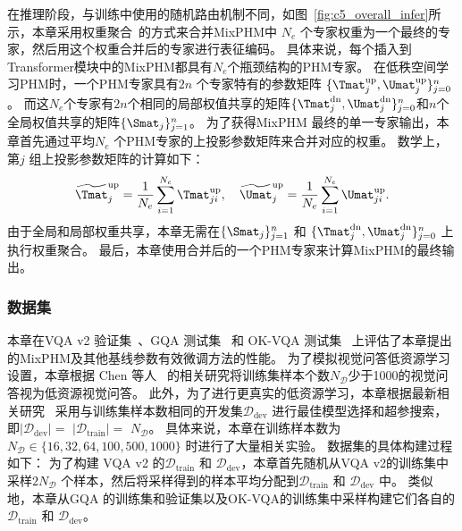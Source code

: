 在推理阶段，与训练中使用的随机路由机制不同，如图~\ref{fig:c5_overall_infer}所示，本章采用权重聚合~\cite{wortsman2022model}的方式来合并MixPHM中 $N_e$ 个专家权重为一个最终的专家，然后用这个权重合并后的专家进行表征编码。
具体来说，每个插入到Transformer模块中的MixPHM都具有$N_e$个瓶颈结构的PHM专家。
在低秩空间学习PHM时，一个PHM专家具有$2n$ 个专家特有的参数矩阵 $\{\Tmat_j^{\text{up}}, \Umat_j^{\text{up}}\}_{j=0}^n$。
而这$N_e$个专家有$2n$个相同的局部权值共享的矩阵$\{\Tmat_j^{\text{dn}}, \Umat_j^{\text{dn}}\}_{j=0}^n$和$n$个全局权值共享的矩阵$\{\Smat_j \}_{j=1}^n$。
为了获得MixPHM 最终的单一专家输出，本章首先通过平均$N_e$ 个PHM专家的上投影参数矩阵来合并对应的权重。
数学上，第$j$ 组上投影参数矩阵的计算如下：
\begin{equation}
\begin{aligned}
\widetilde{\Tmat}_j^{\text{up}} = \frac{1}{N_e} \sum_{i=1}^{N_e} \Tmat_{ji}^{\text{up}}, \quad
\widetilde{\Umat}_j^{\text{up}} = \frac{1}{N_e} \sum_{i=1}^{N_e} \Umat_{ji}^{\text{up}}. 
\label{eq:weight_merge}
\end{aligned}
\end{equation} 
由于全局和局部权重共享，本章无需在$\{\Smat_j \}_{j=1}^n$ 和 $\{\Tmat_j^{\text{dn}}, \Umat_j^{\text{dn}}\}_{j=0}^n$ 上执行权重聚合。
最后，本章使用合并后的一个PHM专家来计算MixPHM的最终输出。





\subsubsection{数据集}
本章在VQA v2 验证集~\cite{goyal2017making}、GQA 测试集~\cite{hudson2019gqa} 和 OK-VQA 测试集~\cite{marino2019ok} 上评估了本章提出的MixPHM及其他基线参数有效微调方法的性能。
为了模拟视觉问答低资源学习设置，本章根据 Chen 等人~\cite{chen2022revisiting} 的相关研究将训练集样本个数$N_{\mathcal{D}}$少于1000的视觉问答视为低资源视觉问答。
此外，为了进行更真实的低资源学习，本章根据最新相关研究~\cite{perez2021true,gao2021making} 采用与训练集样本数相同的开发集$\mathcal{D}_{\text{dev}}$ 进行最佳模型选择和超参搜索，即$|\mathcal{D}_{\text{dev}}|=$  $|\mathcal{D}_{\text{train}}|=$ $N_{\mathcal{D}}$。
具体来说，本章在训练样本数为$N_{\mathcal{D}} \in \{16, 32, 64, 100, 500, 1000\}$ 时进行了大量相关实验。
数据集的具体构建过程如下：
为了构建 VQA v2 的$\mathcal{D}_{\text{train}}$ 和 $\mathcal{D}_{\text{dev}}$，本章首先随机从VQA v2的训练集中采样$2N_{\mathcal{D}}$ 个样本，然后将采样得到的样本平均分配到$\mathcal{D}_{\text{train}}$ 和 $\mathcal{D}_{\text{dev}}$ 中。
类似地，本章从GQA 的训练集和验证集以及OK-VQA的训练集中采样构建它们各自的$\mathcal{D}_{\text{train}}$ 和 $\mathcal{D}_{\text{dev}}$。



